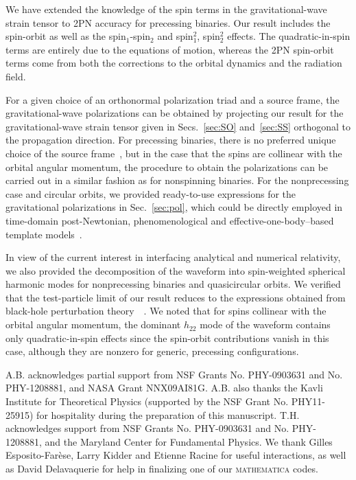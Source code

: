\documentclass[aps, prd,
twocolumn,%
superscriptaddress,
showpacs, nofootinbib, eqsecnum, amsmath, amssymb, floatfix
]{revtex4}
\begin{document}
We have extended the knowledge of the spin terms in the gravitational-wave
strain tensor to 2PN accuracy for precessing binaries. Our result includes the
spin-orbit as well as the spin${}_1$-spin${}_2$ and spin${}^2_1$,
spin${}_{2}^2$ effects. The quadratic-in-spin terms are entirely due to the
equations of motion, whereas the 2PN spin-orbit terms come from both the
corrections to the orbital dynamics and the radiation field.

For a given choice of an orthonormal polarization triad and a source frame,
the gravitational-wave polarizations can be obtained by projecting our result
for the gravitational-wave strain tensor given in Secs.~\ref{sec:SO}
and~\ref{sec:SS} orthogonal to the propagation direction. For precessing
binaries, there is no preferred unique choice of the source
frame~\cite{Finn1993, Kidder:1995zr,Buonanno:2002fy,Schmidt:2010it,
  OShaughnessy2011, Ochsner2012, 2011PhRvD..84l4011B,Schmidt:2012rh}, but in
the case that the spins are collinear with the orbital angular
momentum, the procedure to obtain the polarizations can be carried
out in a similar fashion as for nonspinning binaries. For the
nonprecessing case and circular orbits, we provided ready-to-use
expressions for the gravitational polarizations in
Sec.~\ref{sec:pol}, which could be directly employed in time-domain
post-Newtonian, phenomenological and effective-one-body--based
template models~\cite{Kidder:1995zr,
Arun:2009,Ajith:2008,Damour2009a,Pan:2009wj,
  Santamaria:2010yb,Pan:2011gk}.

In view of the current interest in interfacing analytical and
numerical relativity, we also provided the decomposition of the
waveform into spin-weighted spherical harmonic modes for
nonprecessing binaries and quasicircular orbits. We verified that
the test-particle limit of our result reduces to the expressions
obtained from black-hole perturbation
theory~~\cite{Tagoshi:1996gh,Pan2010hz}. We noted that for spins
collinear with the orbital angular momentum, the dominant $h_{22}$
mode of the waveform contains only quadratic-in-spin effects since
the spin-orbit contributions vanish in this case, although they are
nonzero for generic, precessing configurations.

\begin{acknowledgments} A.B. acknowledges partial support from NSF Grants
No. PHY-0903631 and No. PHY-1208881, and NASA Grant NNX09AI81G. A.B.
also thanks the Kavli Institute for Theoretical Physics (supported
by the NSF Grant No. PHY11-25915) for hospitality during the
preparation of this manuscript. T.H. acknowledges support from  NSF
Grants No. PHY-0903631 and No. PHY-1208881,  and the Maryland Center
for Fundamental Physics. We thank Gilles Esposito-Far\`ese, Larry
Kidder and Etienne Racine for useful interactions, as well as David
Delavaquerie for help in finalizing one of our \textsc{mathematica}
codes.
\end{acknowledgments}
\end{document}
